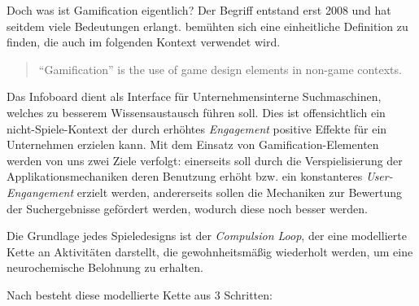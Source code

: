 \documentclass[12pt,twoside]{book}
\begin{document}
Doch was ist Gamification eigentlich? Der Begriff entstand erst 2008 und hat seitdem viele Bedeutungen erlangt. \citep{deterding2011game} bemühten sich eine einheitliche Definition zu finden, die auch im folgenden Kontext verwendet wird.

\begin{quote}
	``Gamification'' is the use of game design elements in non-game contexts.
\end{quote}

Das Infoboard dient als Interface für Unternehmensinterne Suchmaschinen, welches zu besserem Wissensaustausch führen soll. Dies ist offensichtlich ein nicht-Spiele-Kontext der durch erhöhtes \textit{Engagement} positive Effekte für ein Unternehmen erzielen kann.
Mit dem Einsatz von Gamification-Elementen werden von uns zwei Ziele verfolgt: einerseits soll durch die Verspielisierung der Applikationsmechaniken deren Benutzung erhöht bzw. ein konstanteres \textit{User-Engangement} erzielt werden, andererseits sollen die Mechaniken zur Bewertung der Suchergebnisse gefördert werden, wodurch diese noch besser werden.


Die Grundlage jedes Spieledesigns ist der \textit{Compulsion Loop}, der eine modellierte Kette an Aktivitäten darstellt, die gewohnheitsmäßig wiederholt werden, um eine neurochemische Belohnung zu erhalten.

Nach \citep{gamasutra} besteht diese modellierte Kette aus 3 Schritten:
\end{document}
